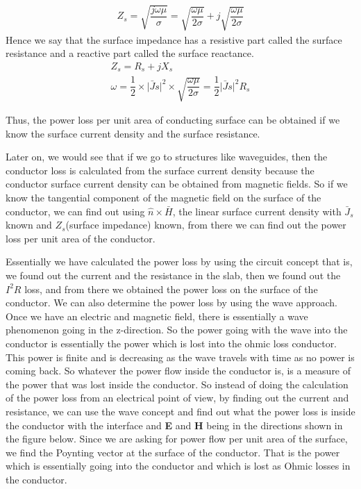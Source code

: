 \begin{align}
Z_{s}=\sqrt{\dfrac{j\omega\mu}{\sigma}}=\sqrt{\dfrac{\omega\mu}{2\sigma}}+j\sqrt{\dfrac{\omega\mu}{2\sigma}}
\end{align}
Hence we say that the surface impedance has a resistive part called the surface resistance and a reactive part called the surface reactance.
\begin{align}
Z_{s}=R_{s}+jX_{s}\\	
\omega=\dfrac{1}{2}\times \lvert\bar{J}s\rvert^{2}\times \sqrt{\dfrac{\omega\mu}{2\sigma}}=\dfrac{1}{2}\lvert\bar{J}s\rvert^{2}R_{s}
\end{align}

Thus, the power loss per unit area of conducting surface can be obtained if we know the surface current density and the surface resistance.

Later on, we would see that if we go to structures like waveguides, then the conductor loss is calculated from the surface current density because the conductor surface current density can be obtained from magnetic fields. So if we know the tangential component of the magnetic field on the surface of the conductor, we can find out using $\hat{n}\times\bar{H}$, the linear surface current density with $\bar{J}_s$ known and $Z_{s}$(surface impedance) known, from there we can find out the power loss per unit area of the conductor.

Essentially we have calculated the power loss by using the circuit concept that is, we found out the current and the resistance in the slab, then we found out the $I^{2}R$ loss, and from there we obtained the power loss on the surface of the conductor. We can also determine the power loss by using the wave approach. Once we have an electric and magnetic field, there is essentially a wave phenomenon going in the z-direction. So the power going with the wave into the conductor is essentially the power which is lost into the ohmic loss conductor. This power is finite and is decreasing as the wave travels with time as no power is coming back. So whatever the power flow inside the conductor is, is a measure of the power that was lost inside the conductor. So instead of doing the calculation of the power loss from an electrical point of view, by finding out the current and resistance, we can use the wave concept and find out what the power loss is inside the conductor with the interface and \textbf{E} and \textbf{H} being in the directions shown in the figure below. Since we are asking for power flow per unit area of the surface, we find the Poynting vector at the surface of the conductor. That is the power which is essentially going into the conductor and which is lost as Ohmic losses in the conductor.

